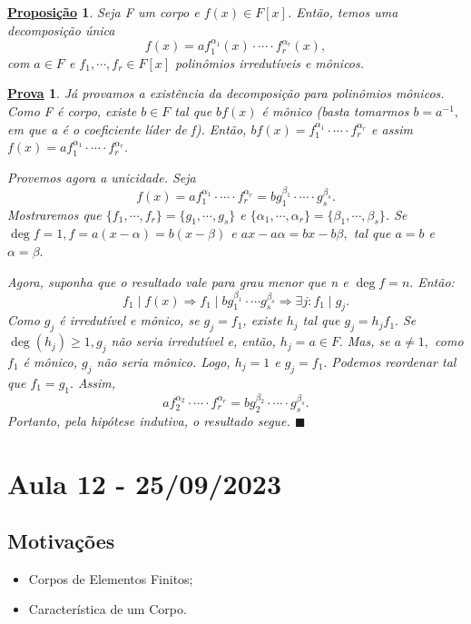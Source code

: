 \documentclass{article}
\newtheorem*{prop*}{\underline{Proposi\c c\~ao}}
\newtheorem*{proof*}{\underline{Prova}}
\renewcommand\qedsymbol{$\blacksquare$}
\begin{document}
\begin{prop*}
  Seja F um corpo e \(f(x)\in F[x]\). Então, temos uma decomposição única 
  \[
    f(x) = af_{1}^{\alpha_{1}}(x)\cdot \cdots \cdot f_{r}^{\alpha_{r}}(x),
  \]
  com \(a\in F\) e \(f_{1}, \cdots, f_{r}\in F[x]\) polinômios irredutíveis e mônicos.
\end{prop*}
\begin{proof*}
  Já provamos a existência da decomposição para polinômios mônicos. Como F é corpo, existe \(b\in F\) tal que 
 \(bf(x)\) é mônico (basta tomarmos \(b=a^{-1},\) em que a é o coeficiente líder de f). Então, \(bf(x) = f_{1}^{\alpha_{1}}\cdot \cdots \cdot f_{r}^{\alpha_{r}}\)
e assim \(f(x) =af_{1}^{\alpha_{1}}\cdot \cdots \cdot f_{r}^{\alpha_{r}}.\)

  Provemos agora a unicidade. Seja 
  \[
    f(x)=af_{1}^{\alpha_{1}} \cdot \cdots \cdot f_{r}^{\alpha_{r}} = bg_{1}^{\beta_{1}} \cdot \cdots \cdot g_{s}^{\beta_{s}}.
  \]
  Mostraremos que \(\{f_{1}, \cdots, f_{r}\} = \{g_{1}, \cdots, g_{s}\}\) e \(\{\alpha_{1}, \cdots, \alpha_{r}\} = \{\beta_{1}, \cdots, \beta_{s}\}\).
Se \(\deg{f} = 1, f = a(x-\alpha ) = b(x-\beta )\) e \(ax -a\alpha =bx - b\beta,\) tal que \(a=b\) e \(\alpha =\beta .\)

  Agora, suponha que o resultado vale para grau menor que n e \(\deg{f} = n.\) Então: 
  \[
    f_{1}\mid f(x) \Rightarrow f_{1}\mid bg_{1}^{\beta_{1}}\cdot \cdots g_{s}^{\beta_{s}} \Rightarrow \exists j: f_{1}\mid g_{j}.
  \]
  Como \(g_{j}\) é irredutível e mônico, se \(g_{j}=f_{1}\), existe \(h_{j}\) tal que \(g_{j} = h_{j}f_{1}.\) Se \(\deg{(h_{j})}\geq 1, g_{j}\) não seria
irredutível e, então, \(h_{j} = a\in F.\) Mas, se \(a\neq1,\) como \(f_{1}\) é mônico, \(g_{j}\) não seria mônico. Logo, \(h_{j} = 1\) e \(g_{j} = f_{1}.\) 
Podemos reordenar tal que \(f_{1} = g_{1}. \) Assim, 
  \[
    af_{2}^{\alpha_{2}}\cdot \cdots \cdot f_{r}^{\alpha_{r}} = bg_{2}^{\beta_{2}} \cdot \cdots \cdot g_{s}^{\beta_{s}}.
  \]
  Portanto, pela hipótese indutiva, o resultado segue. \qedsymbol
\end{proof*}
\newpage

\section{Aula 12 - 25/09/2023}
\subsection{Motivações}
\begin{itemize}
  \item Corpos de Elementos Finitos;
  \item Característica de um Corpo.
\end{itemize}
\end{document}
